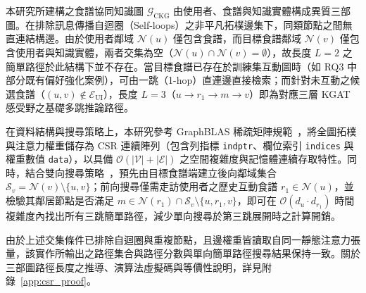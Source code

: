 本研究所建構之食譜協同知識圖 $\mathcal{G}_{\text{CKG}}$ 由使用者、食譜與知識實體構成異質三部圖。在排除訊息傳播自迴圈（Self-loops）之非平凡拓樸邊集下，同類節點之間無直連結構邊。由於使用者鄰域 $\mathcal{N}(u)$ 僅包含食譜，而目標食譜鄰域 $\mathcal{N}(v)$ 僅包含使用者與知識實體，兩者交集為空（$\mathcal{N}(u) \cap \mathcal{N}(v) = \emptyset$），故長度 $L=2$ 之簡單路徑於此結構下並不存在。當目標食譜已存在於訓練集互動圖時（如 RQ3 中部分既有偏好強化案例），可由一跳（1-hop）直連邊直接檢索；而針對未互動之候選食譜（$(u,v) \notin \mathcal{E}_{\text{UI}}$），長度 $L=3$（$u \to r_1 \to m \to v$）即為對應三層 KGAT 感受野之基礎多跳推論路徑。

在資料結構與搜尋策略上，本研究參考 GraphBLAS 稀疏矩陣規範~\cite{kepner2016graphblas}，將全圖拓樸與注意力權重儲存為 CSR 連續陣列（包含列指標 \texttt{indptr}、欄位索引 \texttt{indices} 與權重數值 \texttt{data}），以具備 $\mathcal{O}(|\mathcal{V}| + |\mathcal{E}|)$ 之空間複雜度與記憶體連續存取特性。同時，結合雙向搜尋策略~\cite{pohl1971bi}，預先由目標食譜端建立後向鄰域集合 $\mathcal{S}_v = \mathcal{N}(v) \setminus \{u, v\}$；前向搜尋僅需走訪使用者之歷史互動食譜 $r_1 \in \mathcal{N}(u)$，並檢驗其鄰居節點是否滿足 $m \in \mathcal{N}(r_1) \cap \mathcal{S}_v \setminus \{u, r_1, v\}$，即可在 $\mathcal{O}(d_u \cdot d_{r_1})$ 時間複雜度內找出所有三跳簡單路徑，減少單向搜尋於第三跳展開時之計算開銷。

由於上述交集條件已排除自迴圈與重複節點，且邊權重皆讀取自同一靜態注意力張量，該實作所輸出之路徑集合與路徑分數與單向簡單路徑搜尋結果保持一致。關於三部圖路徑長度之推導、演算法虛擬碼與等價性說明，詳見附錄~\ref{app:csr_proof}。




